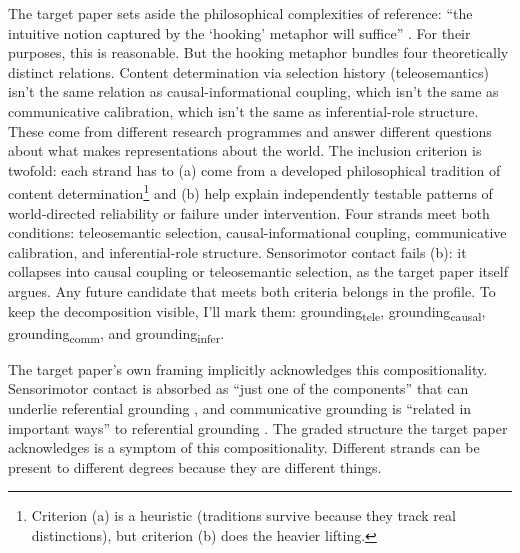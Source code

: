 \documentclass[12pt]{article}
\newcommand{\gtele}{grounding\textsubscript{tele}}
\newcommand{\gcausal}{grounding\textsubscript{causal}}
\newcommand{\gcomm}{grounding\textsubscript{comm}}
\newcommand{\ginfer}{grounding\textsubscript{infer}}
\begin{document}
The target paper sets aside the philosophical complexities of reference: \enquote{the intuitive notion captured by the `hooking' metaphor will suffice} \citep[fn.\ 11, p.\ 6]{coelho_mollo_milliere_2026_vector_grounding_problem}. For their purposes, this is reasonable. But the hooking metaphor bundles four theoretically distinct relations. Content determination via selection history (teleosemantics) isn't the same relation as causal-informational coupling, which isn't the same as communicative calibration, which isn't the same as inferential-role structure. These come from different research programmes and answer different questions about what makes representations about the world. The inclusion criterion is twofold: each strand has to (a) come from a developed philosophical tradition of content determination\footnote{Criterion (a) is a heuristic (traditions survive because they track real distinctions), but criterion (b) does the heavier lifting.} and (b) help explain independently testable patterns of world-directed reliability or failure under intervention. Four strands meet both conditions: teleosemantic selection, causal-informational coupling, communicative calibration, and inferential-role structure. Sensorimotor contact fails (b): it collapses into causal coupling or teleosemantic selection, as the target paper itself argues. Any future candidate that meets both criteria belongs in the profile. To keep the decomposition visible, I'll mark them: \gtele{}, \gcausal{}, \gcomm{}, and \ginfer{}.

The target paper's own framing implicitly acknowledges this compositionality. Sensorimotor contact is absorbed as \enquote{just one of the components} that can underlie referential grounding \citep[9]{coelho_mollo_milliere_2026_vector_grounding_problem}, and communicative grounding is \enquote{related in important ways} to referential grounding \citep[8]{coelho_mollo_milliere_2026_vector_grounding_problem}. The graded structure the target paper acknowledges is a symptom of this compositionality. Different strands can be present to different degrees because they are different things.
\end{document}
